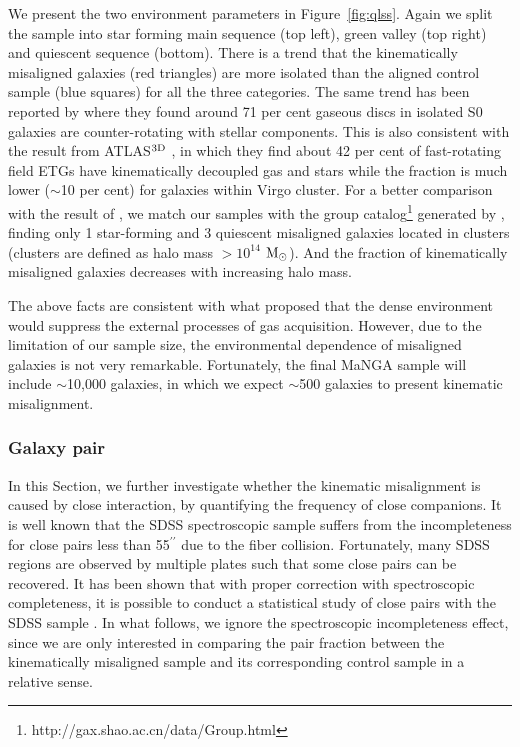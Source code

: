 \documentclass[a4paper,fleqn,usenatbib]{mnras}
\newcommand{\msun}{$\rm M_\odot$}
\begin{document}
We present the two environment parameters in  Figure~\ref{fig:qlss}. Again we split the sample into star forming main sequence (top left), green valley (top right) and quiescent sequence (bottom). There is a trend that the kinematically misaligned galaxies (red triangles) are more isolated than the aligned control sample (blue squares) for all the three categories. 
The same trend has been reported by \cite{katkov-2014} where they found around 71 per cent gaseous discs in isolated S0 galaxies are counter-rotating with stellar components.
This is also consistent with the result from ATLAS$^{\rm3D}$ \citep{davis-2011}, in which they find about 42 per cent of fast-rotating field ETGs have kinematically decoupled gas and stars while the fraction is much lower ($\sim$10 per cent) for galaxies within Virgo cluster. 
For a better comparison with the result of \cite{davis-2011}, we match our samples with the group catalog\footnote{http://gax.shao.ac.cn/data/Group.html} generated by \cite{yang-2007}, finding only 1 star-forming and 3 quiescent misaligned galaxies located in clusters (clusters are defined as halo mass $>10^{14}$ \msun). And the fraction of kinematically misaligned galaxies decreases with increasing halo mass.

The above facts are consistent with what \cite{davis-2011} proposed that the dense environment would suppress the external processes of gas acquisition. However, due to the limitation of our sample size, the environmental dependence of misaligned galaxies is not very remarkable. Fortunately, the final MaNGA sample will include $\sim$10,000 galaxies, in which we expect $\sim$500 galaxies to present kinematic misalignment. 

\subsubsection{Galaxy pair}

In this Section, we further investigate whether the kinematic misalignment is caused by close interaction, by quantifying the frequency of close companions. It is well known that the SDSS spectroscopic sample suffers from the incompleteness for close pairs less than 55$^{\prime\prime}$ due to the fiber collision. Fortunately, many SDSS regions are observed by multiple plates such that some close pairs can be recovered. It has been shown that with proper correction with spectroscopic completeness, it is possible to conduct a statistical study of close pairs with the SDSS sample \citep{patton-2008}. In what follows, we ignore the spectroscopic incompleteness effect, since we are only interested in comparing the pair fraction between the kinematically misaligned sample and its corresponding control sample in a relative sense. 
\end{document}
